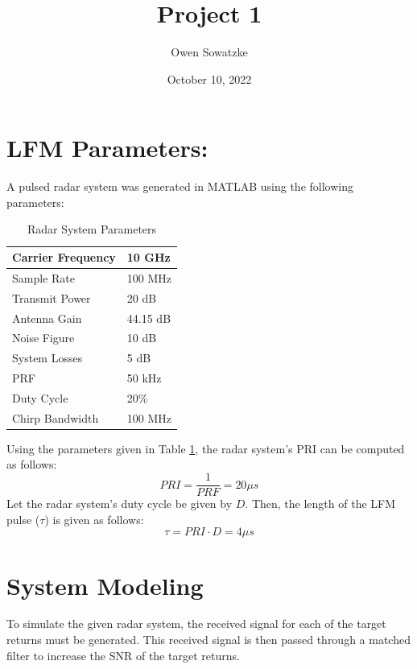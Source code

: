 \documentclass[12pt,letterpaper]{article}
\title{Project 1}
\author{Owen Sowatzke}
\date{October 10, 2022}
\begin{document}
\maketitle
\section{LFM Parameters:}
A pulsed radar system was generated in MATLAB using the following parameters:
\begin{table}[H]
\caption{Radar System Parameters}
\label{Parameter Table}
\begin{tabularx}{\textwidth}{| X | X |}
\hline
Carrier Frequency & 10 GHz \\
\hline
Sample Rate & 100 MHz \\
\hline
Transmit Power & 20 dB \\
\hline
Antenna Gain & 44.15 dB \\
\hline
Noise Figure & 10 dB \\
\hline 
System Losses & 5 dB \\
\hline
PRF & 50 kHz \\
\hline
Duty Cycle & 20\% \\
\hline
Chirp Bandwidth & 100 MHz \\
\hline
\end{tabularx}
\end{table}
\noindent
Using the parameters given in Table \ref{Parameter Table}, the radar system's PRI can be computed as follows:
\begin{equation}
PRI = \frac{1}{PRF} = 20 {\mu}s
\label{PRI Equation}
\end{equation}
Let the radar system's duty cycle be given by $D$. Then, the length of the LFM pulse ($\tau$) is given as follows:
\begin{equation}
\tau = PRI \cdot D = 4 {\mu}s
\label{tau equation}
\end{equation}
\section{System Modeling}
To simulate the given radar system, the received signal for each of the target returns must be generated. This received signal is then passed through a matched filter to increase the SNR of the target returns.
\end{document}

